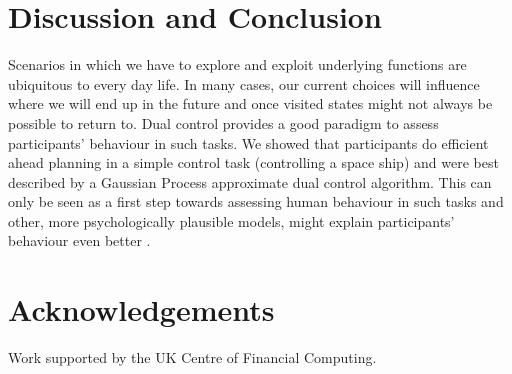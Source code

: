 \documentclass[10pt,letterpaper]{article}
\begin{document}
\section{Discussion and Conclusion}
Scenarios in which we have to explore and exploit underlying functions are ubiquitous to every day life. In many cases, our current choices will influence where we will end up in the future and once visited states might not always be possible to return to. Dual control provides a good paradigm to assess participants' behaviour in such tasks. We showed that participants do efficient ahead planning in a simple control task (controlling a space ship) and were best described by a Gaussian Process approximate dual control algorithm. This can only be seen as a first step towards assessing human behaviour in such tasks and other, more psychologically plausible models, might explain participants' behaviour even better \citep{bramleystaying}. 
\section{Acknowledgements}
Work supported by the UK Centre of Financial Computing.


\end{document}
